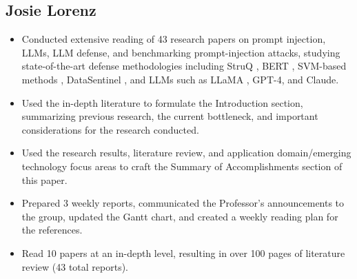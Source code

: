 \documentclass[12pt, letterpaper]{article}   %
\begin{document}
\subsection{Josie Lorenz}
\begin{itemize}
    \item Conducted extensive reading of 43 research papers on prompt injection, LLMs, LLM defense, and benchmarking prompt-injection attacks, studying state-of-the-art defense methodologies including StruQ \cite{ref20}, BERT \cite{ref15}, SVM-based methods \cite{ref27}, DataSentinel \cite{ref42}, and LLMs such as LLaMA \cite{ref31}, GPT-4, and Claude.
    \item Used the in-depth literature to formulate the Introduction section, summarizing previous research, the current bottleneck, and important considerations for the research conducted.
    \item Used the research results, literature review, and application domain/emerging technology focus areas to craft the Summary of Accomplishments section of this paper.
    \item Prepared 3 weekly reports, communicated the Professor's announcements to the group, updated the Gantt chart, and created a weekly reading plan for the references.
    \item Read 10 papers at an in-depth level, resulting in over 100 pages of literature review \cite{ref1,ref14,ref7,ref39,ref41,ref42,ref16,ref9,ref19,ref25} (43 total reports).
\end{itemize}
\end{document}
